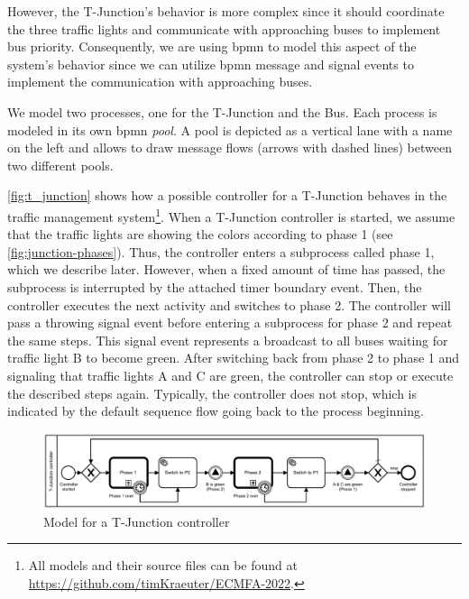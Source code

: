 \documentclass{jot}
\begin{document}
However, the T-Junction's behavior is more complex since it should coordinate the three traffic lights and communicate with approaching buses to implement bus priority.
Consequently, we are using \gls*{bpmn} to model this aspect of the system's behavior since we can utilize \gls*{bpmn} message and signal events to implement the communication with approaching buses.

We model two processes, one for the T-Junction and the Bus.
Each process is modeled in its own \gls*{bpmn} \emph{pool}.
A pool is depicted as a vertical lane with a name on the left and allows to draw message flows (arrows with dashed lines) between two different pools.

\autoref{fig:t_junction} shows how a possible controller for a T-Junction behaves in the traffic management system\footnote{All models and their source files can be found at \url{https://github.com/timKraeuter/ECMFA-2022}.\label{footnote:fullModels}}.
When a T-Junction controller is started, we assume that the traffic lights are showing the colors according to phase 1 (see \autoref{fig:junction-phases}).
Thus, the controller enters a subprocess called phase 1, which we describe later.
However, when a fixed amount of time has passed, the subprocess is interrupted by the attached timer boundary event.
Then, the controller executes the next activity and switches to phase 2.
The controller will pass a throwing signal event before entering a subprocess for phase 2 and repeat the same steps.
This signal event represents a broadcast to all buses waiting for traffic light B to become green.
After switching back from phase 2 to phase 1 and signaling that traffic lights A and C are green, the controller can stop or execute the described steps again.
Typically, the controller does not stop, which is indicated by the default sequence flow going back to the process beginning.

\begin{figure}[h]
    \centering
    \includegraphics[width=1\textwidth]{figures/t-junction.pdf}
    \caption{Model for a T-Junction controller}
    \label{fig:t_junction}
\end{figure}
\end{document}
